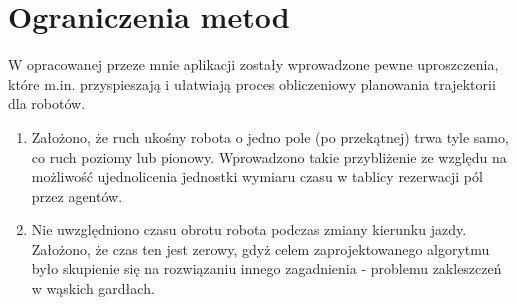 \section{Ograniczenia metod}
W opracowanej przeze mnie aplikacji zostały wprowadzone pewne uproszczenia, które m.in. przyspieszają i ułatwiają proces obliczeniowy planowania trajektorii dla robotów.
\begin{enumerate}
	\item Założono, że ruch ukośny robota o jedno pole (po przekątnej) trwa tyle samo, co ruch poziomy lub pionowy. Wprowadzono takie przybliżenie ze względu na możliwość ujednolicenia jednostki wymiaru czasu w tablicy rezerwacji pól przez agentów.
	\item Nie uwzględniono czasu obrotu robota podczas zmiany kierunku jazdy. Założono, że czas ten jest zerowy, gdyż celem zaprojektowanego algorytmu było skupienie się na rozwiązaniu innego zagadnienia - problemu zakleszczeń w wąskich gardłach.
\end{enumerate}
